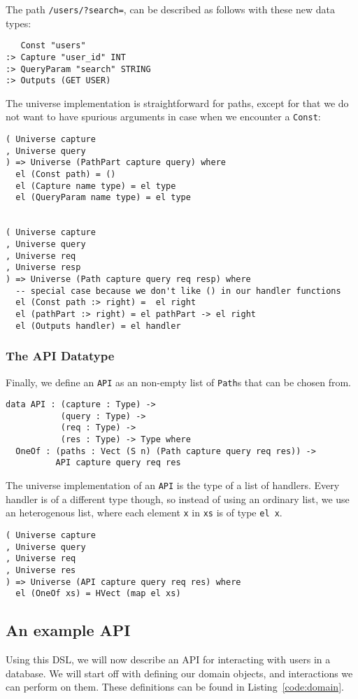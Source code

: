 \documentclass[12pt,a4paper]{article}
\begin{document}
The path \texttt{/users/?search=}, can be described as follows with these new data types:
\begin{verbatim}
   Const "users"
:> Capture "user_id" INT
:> QueryParam "search" STRING
:> Outputs (GET USER)
\end{verbatim}

The universe implementation is straightforward for paths, except for
that we do not want to have spurious arguments in case when we encounter
a \texttt{Const}: 
\begin{verbatim}
( Universe capture
, Universe query
) => Universe (PathPart capture query) where
  el (Const path) = ()
  el (Capture name type) = el type
  el (QueryParam name type) = el type


( Universe capture
, Universe query
, Universe req
, Universe resp
) => Universe (Path capture query req resp) where
  -- special case because we don't like () in our handler functions
  el (Const path :> right) =  el right
  el (pathPart :> right) = el pathPart -> el right
  el (Outputs handler) = el handler
\end{verbatim}

\subsubsection{The API Datatype}
Finally, we define an \texttt{API} as an non-empty list of \texttt{Path}s that can be chosen from.

\begin{verbatim}
data API : (capture : Type) ->
           (query : Type) ->
           (req : Type) ->
           (res : Type) -> Type where
  OneOf : (paths : Vect (S n) (Path capture query req res)) ->
          API capture query req res
\end{verbatim}

The universe implementation of an \texttt{API} is the type of a list of handlers.
Every handler is of a different type though, so instead of using an ordinary list,
we use an heterogenous list, where each element \texttt{x} in \texttt{xs}
is of type \texttt{el x}.
\begin{verbatim}
( Universe capture
, Universe query
, Universe req
, Universe res
) => Universe (API capture query req res) where
  el (OneOf xs) = HVect (map el xs)
\end{verbatim}

\subsection{An example API}
Using this DSL, we will now describe an API for interacting with users in a database.
We will start off with defining our domain objects, and interactions we can perform on them.
These definitions can be found in Listing~\ref{code:domain}.
\end{document}
